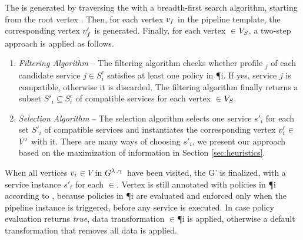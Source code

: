     The \pipelineInstance  is generated by traversing the \pipelineTemplate with a breadth-first search algorithm, starting from the root vertex .
    Then, for each vertex $v_{f}$ in the pipeline template, the corresponding vertex $v'_{f}$ is generated.
    Finally, for each vertex $\in$$V_S$, a two-step approach is applied as follows.

  \begin{enumerate}

    \item \textit{Filtering Algorithm} -- The filtering algorithm checks whether profile \profile$_j$ of each candidate service $\si{j}$$\in$$S^c_{i}$ satisfies at least one policy in \P{i}. If yes,  service $\si{j}$ is compatible, otherwise it is discarded. The filtering algorithm finally returns a subset $S'_{i}$$\subseteq$$S^c_{i}$ of compatible services for each vertex $\in$$V_S$.
    \item \textit{Selection Algorithm} -- The selection algorithm selects one service $s'_i$ for each set $S'_{i}$ of compatible services and instantiates the corresponding vertex $v'_{i}$$\in$$V'$ with it. There are many ways of choosing $s'_i$, we present our approach based on the maximization of information \quality \emph{\q} in Section \ref{sec:heuristics}.
  \end{enumerate}

  When all vertices $v_{i}$$\in$$V$ in $G^{\lambda\,,\gamma\,}$ have been visited, the \pipelineInstance G' is finalized, with a service instance $s'_i$ for each $\in$\Vp. Vertex  is still annotated with policies in \P{i} according to \myLambda, because policies in \P{i} are evaluated and enforced only when the pipeline instance is triggered, before any service is executed. In case policy evaluation returns \emph{true}, data transformation \TP$\in$\P{i} is applied, otherwise a default transformation that removes all data is applied.

